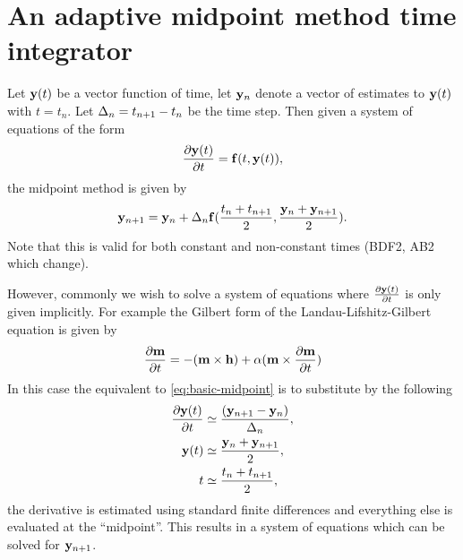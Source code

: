


\section{An adaptive midpoint method time integrator}







Let $\mathbf{y}(t)$ be a vector function of time, let $\mathbf{y}_n$ denote a vector of estimates to $\mathbf{y}(t)$ with $t = t_n$.
Let $\Delta_{n} = t_{n+1} - t_n$ be the time step.
Then given a system of equations of the form
\begin{equation}
  \frac{\partial \mathbf{y}(t)}{\partial t} = {\mathbf{f}}(t, \mathbf{y}(t)),
\end{equation}
the midpoint method is given by
\begin{equation}
  \mathbf{y}_{n+1} = \mathbf{y}_n + \Delta_{n} {\mathbf{f}}(\frac{t_n + t_{n+1}}{2}, \frac{\mathbf{y}_n + \mathbf{y}_{n+1}}{2}).
  \label{eq:basic-midpoint}
\end{equation}
Note that this is valid for both constant and non-constant times (\cf BDF2, AB2 which change).

However, commonly we wish to solve a system of equations where $ \frac{\partial \mathbf{y}(t)}{\partial t}$ is only given implicitly. For example the Gilbert form of the Landau-Lifshitz-Gilbert equation is given by
\begin{equation}
  \frac{\partial \mathbf{m}}{\partial t} = -(\mathbf{m} \times \mathbf{h}) + \alpha (\mathbf{m} \times \frac{\partial \mathbf{m}}{\partial t})
\end{equation}
 In this case the equivalent to \eqref{eq:basic-midpoint} is to substitute by the following
\begin{align}
  \frac{\partial \mathbf{y}(t)}{\partial t} & \simeq \frac{(\mathbf{y}_{n+1} - \mathbf{y}_n)}{\Delta_{n}}, \\
  \mathbf{y}(t) & \simeq \frac{\mathbf{y}_n + \mathbf{y}_{n+1}}{2}, \notag \\
  t & \simeq \frac{t_n + t_{n+1}}{2}, \notag
\end{align}
\ie the derivative is estimated using standard finite differences and everything else is evaluated at the ``midpoint''. This results in a system of equations which can be solved for $\mathbf{y}_{n+1}$.










